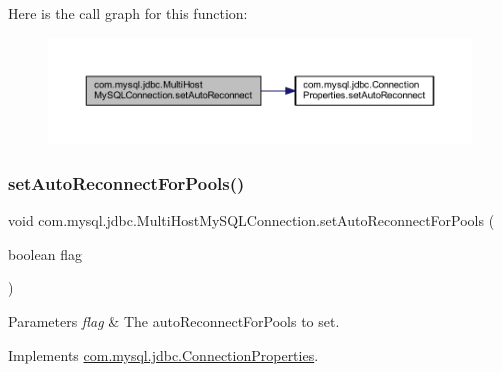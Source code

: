 Here is the call graph for this function\+:
\nopagebreak
\begin{figure}[H]
\begin{center}
\leavevmode
\includegraphics[width=350pt]{classcom_1_1mysql_1_1jdbc_1_1_multi_host_my_s_q_l_connection_a5444b292e218f16cfc2baadf784c35ab_cgraph}
\end{center}
\end{figure}
\mbox{\label{classcom_1_1mysql_1_1jdbc_1_1_multi_host_my_s_q_l_connection_a74082ba356c0d803169347d2abae7efa}} 
\subsubsection{\texorpdfstring{set\+Auto\+Reconnect\+For\+Pools()}{setAutoReconnectForPools()}}
{\footnotesize\ttfamily void com.\+mysql.\+jdbc.\+Multi\+Host\+My\+S\+Q\+L\+Connection.\+set\+Auto\+Reconnect\+For\+Pools (\begin{DoxyParamCaption}\item[{boolean}]{flag }\end{DoxyParamCaption})}


\begin{DoxyParams}{Parameters}
{\em flag} & The auto\+Reconnect\+For\+Pools to set. \\
\hline
\end{DoxyParams}


Implements \mbox{\hyperlink{interfacecom_1_1mysql_1_1jdbc_1_1_connection_properties_afd29baec0fcca703af94fac13342e6bf}{com.\+mysql.\+jdbc.\+Connection\+Properties}}.

